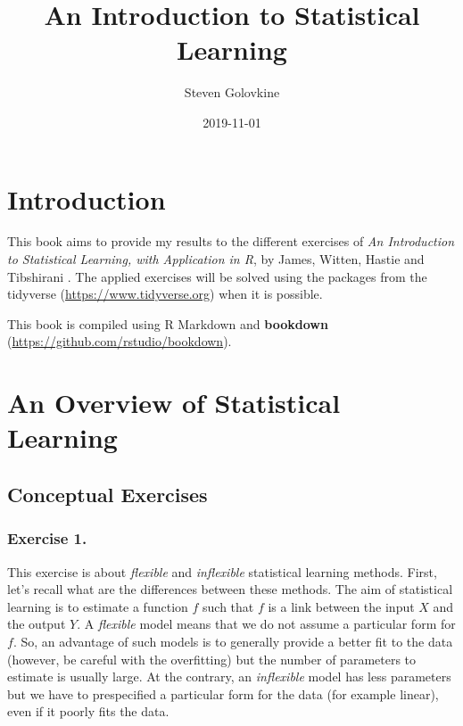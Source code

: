 \documentclass[]{book}
\title{An Introduction to Statistical Learning}
\author{Steven Golovkine}
\date{2019-11-01}
\begin{document}
\maketitle

{
\setcounter{tocdepth}{1}
\tableofcontents
}
\hypertarget{introduction}{%
\chapter{Introduction}\label{introduction}}

This book aims to provide my results to the different exercises of \emph{An Introduction to Statistical Learning, with Application in R}, by James, Witten, Hastie and Tibshirani \citep{James2013}. The applied exercises will be solved using the packages from the tidyverse (\url{https://www.tidyverse.org}) when it is possible.

This book is compiled using R Markdown and \textbf{bookdown} (\url{https://github.com/rstudio/bookdown}).

\hypertarget{overview}{%
\chapter{An Overview of Statistical Learning}\label{overview}}

\hypertarget{conceptual-exercises}{%
\section{Conceptual Exercises}\label{conceptual-exercises}}

\hypertarget{exercise-1.}{%
\subsection{Exercise 1.}\label{exercise-1.}}

This exercise is about \emph{flexible} and \emph{inflexible} statistical learning methods. First, let's recall what are the differences between these methods. The aim of statistical learning is to estimate a function \(f\) such that \(f\) is a link between the input \(X\) and the output \(Y\). A \emph{flexible} model means that we do not assume a particular form for \(f\). So, an advantage of such models is to generally provide a better fit to the data (however, be careful with the overfitting) but the number of parameters to estimate is usually large. At the contrary, an \emph{inflexible} model has less parameters but we have to prespecified a particular form for the data (for example linear), even if it poorly fits the data.
\end{document}
